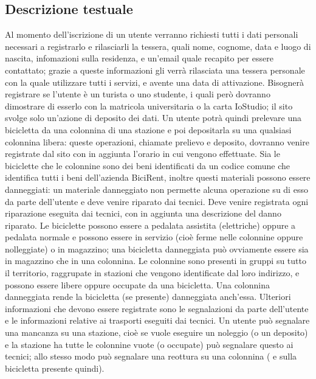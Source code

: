 \documentclass[a4paper,twoside]{article}
\begin{document}
\subsection{Descrizione testuale}
Al momento dell'iscrizione di un utente verranno richiesti tutti i dati personali necessari a registrarlo e rilasciarli la tessera, quali nome, cognome, data e luogo di nascita, infomazioni sulla residenza, e un'email quale recapito per essere contattato; grazie a queste informazioni gli verrà rilasciata una tessera personale con la quale utilizzare tutti i servizi, e avente una data di attivazione.\newline
Bisognerà registrare se l'utente è un turista o uno studente, i quali però dovranno dimostrare di esserlo con la matricola universitaria o la carta IoStudio; il sito svolge solo un'azione di deposito dei dati.\newline
Un utente potrà quindi prelevare una bicicletta da una colonnina di una stazione e poi depositarla su una qualsiasi colonnina libera: queste operazioni, chiamate prelievo e deposito, dovranno venire registrate dal sito con in aggiunta l'orario in cui vengono effettuate.\newline
Sia le biciclette che le colonnine sono dei beni identificati da un codice comune che identifica tutti i beni dell'azienda BiciRent, inoltre questi materiali possono essere danneggiati: un materiale danneggiato non permette alcuna operazione su di esso da parte dell'utente e deve venire riparato dai tecnici.\newline
Deve venire registrata ogni riparazione eseguita dai tecnici, con in aggiunta una descrizione del danno riparato.\newline
Le biciclette possono essere a pedalata assistita (elettriche) oppure a pedalata normale e possono essere in servizio (cioè ferme nelle colonnine oppure nolleggiate) o in magazzino; una bicicletta danneggiata può ovviamente essere sia in magazzino che in una colonnina.\newline
Le colonnine sono presenti in gruppi su tutto il territorio, raggrupate in stazioni che vengono identificate dal loro indirizzo, e possono essere libere oppure occupate da una bicicletta. Una colonnina danneggiata rende la bicicletta (se presente) danneggiata anch'essa.\newline
Ulteriori informazioni che devono essere registrate sono le segnalazioni da parte dell'utente e le informazioni relative ai trasporti eseguiti dai tecnici.\newline
Un utente può segnalare una mancanza su una stazione, cioè se vuole eseguire un noleggio (o un deposito) e la stazione ha tutte le colonnine vuote (o occupate) può segnalare questo ai tecnici; allo stesso modo può segnalare una reottura su una colonnina ( e sulla bicicletta presente quindi).\newline
\end{document}
